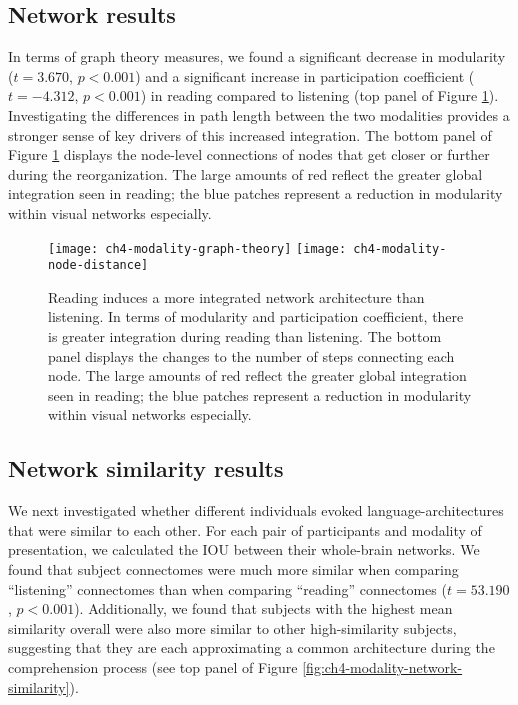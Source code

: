\subsection{Network results}

In terms of graph theory measures, we found a significant decrease in modularity ($t = 3.670$, $p < 0.001$) and a significant increase in participation coefficient ($t = -4.312$, $p < 0.001$) in reading compared to listening (top panel of Figure \ref{fig:ch4-modality-graph-theory}). Investigating the differences in path length between the two modalities provides a stronger sense of key drivers of this increased integration. The bottom panel of Figure \ref{fig:ch4-modality-graph-theory} displays the node-level connections of nodes that get closer or further during the reorganization. The large amounts of red reflect the greater global integration seen in reading; the blue patches represent a reduction in modularity within visual networks especially.

\begin{figure}[t!]
	\centering
	\texttt{[image: ch4-modality-graph-theory]}
	\texttt{[image: ch4-modality-node-distance]}
    \caption[Reading induces a more integrated network architecture than listening]{Reading induces a more integrated network architecture than listening. In terms of modularity and participation coefficient, there is greater integration during reading than listening. The bottom panel displays the changes to the number of steps connecting each node. The large amounts of red reflect the greater global integration seen in reading; the blue patches represent a reduction in modularity within visual networks especially.}
	\label{fig:ch4-modality-graph-theory}
\end{figure}


\subsection{Network similarity results}

We next investigated whether different individuals evoked language-architectures that were similar to each other. For each pair of participants and modality of presentation, we calculated the IOU between their whole-brain networks. We found that subject connectomes were much more similar when comparing ``listening'' connectomes than when comparing ``reading'' connectomes ($t = 53.190$, $p < 0.001$). Additionally, we found that subjects with the highest mean similarity overall were also more similar to other high-similarity subjects, suggesting that they are each approximating a common architecture during the comprehension process (see top panel of Figure \ref{fig:ch4-modality-network-similarity}).

